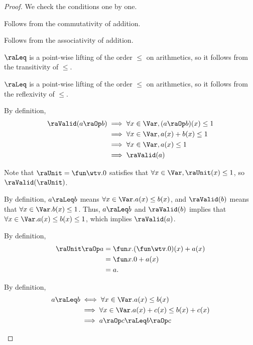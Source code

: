\documentclass[acmsmall,nonacm,screen,appendix]{acmart}
\begin{document}
\begin{proof}
  We check the conditions one by one.
  \begin{induction}
    \step[Condition~$a \raOp b = b \raOp a$]
      Follows from the commutativity of addition.

    \step[Condition~$(a \raOp b) \raOp c = a \raOp (b \raOp c)$]
      Follows from the associativity of addition.

      $\raLeq$ is a point-wise lifting of the order $\leq$ on arithmetics,
      so it follows from the transitivity of $\leq$.

      $\raLeq$ is a point-wise lifting of the order $\leq$ on arithmetics,
      so it follows from the reflexivity of $\leq$.

      By definition,
      \begin{align*}
        \raValid(a \raOp b)
        &\implies \forall x \in \Var, (a \raOp b)(x) \leq 1 \\
        &\implies \forall x \in \Var, a(x) + b(x) \leq 1 \\
        &\implies \forall x \in \Var, a(x) \leq 1 \\
        &\implies \raValid(a)
      \end{align*}

      Note that $\raUnit = \fun \wtv. 0$ satisfies that
      $\forall x \in \Var, \raUnit(x) \leq 1$,
      so $\raValid(\raUnit)$.

      By definition,
      $a \raLeq b$ means
      $\forall x \in \Var. a(x) \leq b(x)$,
      and $\raValid(b)$ means that
      $\forall x \in \Var. b(x) \leq 1$.
      Thus, $a \raLeq b$ and $\raValid(b)$ implies that
      $\forall x \in \Var. a(x) \leq b(x) \leq 1$,
      which implies $\raValid(a)$.

    \step[Condition~$\raUnit \raOp a = a$]
      By definition,
      \begin{align*}
        \raUnit \raOp a
        &= \fun x. (\fun \wtv. 0)(x) + a(x) \\
        &= \fun x. 0 + a(x) \\
        &= a.
      \end{align*}

      By definition,
      \begin{align*}
        a \raLeq b
        &\iff \forall x \in \Var. a(x) \leq b(x) \\
        &\implies \forall x \in \Var. a(x) + c(x) \leq b(x) + c(x) \\
        &\implies a \raOp c \raLeq b \raOp c
        \tag*{\qedhere}
      \end{align*}
  \end{induction}
\end{proof}
\end{document}
